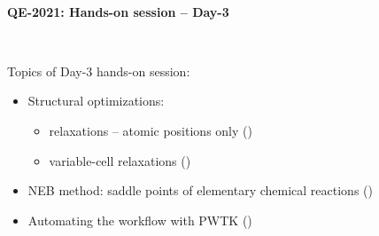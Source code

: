 \documentclass[landscape]{foils}
\begin{document}

\blue
~\\
\vspace*{4cm}
\MyLogo{~}
\vspace{5em}
\begin{center}
  \centerline{\red\LARGE\bf QE-2021: Hands-on session -- Day-3}
  ~\\[1.5em]
\end{center}

Topics of Day-3 hands-on session:
\begin{itemize}
\item Structural optimizations:
  \begin{itemize}
  \item relaxations -- atomic positions only ()
  \item variable-cell relaxations ()
  \end{itemize}
\item NEB method: saddle points of elementary chemical
  reactions ()
\item Automating the workflow with PWTK
  ()\\
\end{itemize}
\end{document}
